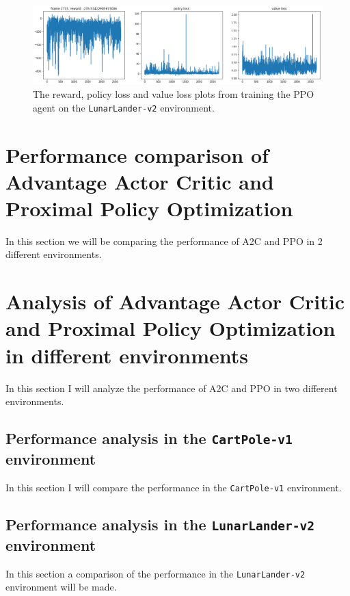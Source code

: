 \documentclass{article}
\begin{document}
  \begin{figure}[h]
   \centering
   \includegraphics[width=\textwidth, angle=90]{LunarLander-PPO-train}
   \caption{The reward, policy loss and value loss plots from training the PPO
            agent on the \texttt{LunarLander-v2} environment.}
   \label{fig:lunar-ppo-train}
  \end{figure}

 \section[Performance comparison of A2C and PPO]{Performance comparison of 
   Advantage Actor Critic and Proximal Policy Optimization}
  In this section we will be comparing the performance of A2C and PPO in 2
  different environments.

 \section[Analysis of A2C and PPO in different environments]{Analysis of 
   Advantage Actor Critic and Proximal Policy Optimization in different 
   environments}
  In this section I will analyze the performance of A2C and PPO in two 
  different environments.

  \subsection[The \texttt{CartPole-v1} environment]{Performance analysis in the
    \texttt{CartPole-v1} environment}
   In this section I will compare the performance in the \texttt{CartPole-v1} 
   environment.

  \subsection[The \texttt{LunarLander-v2} environment]{Performance analysis in 
    the \texttt{LunarLander-v2} environment}
   In this section a comparison of the performance in the \texttt{LunarLander-v2} environment will be made.
\end{document}

